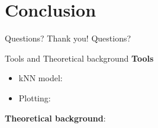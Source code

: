 \section{Conclusion}

\begin{frame}{Questions?}
  \centering
  Thank you! Questions?
\end{frame}

\begin{frame}{Tools and Theoretical background}
  \textbf{Tools}
  \begin{itemize}
    \item kNN model: \cite{scikit-learn}
    \item Plotting: \cite{Hunter:2007}
  \end{itemize}

  \textbf{Theoretical background}: \cite{duda2012pattern}
\end{frame}

